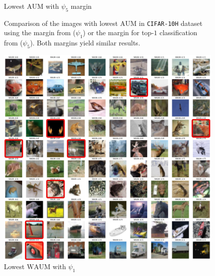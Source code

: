 \begin{figure}[thb]
\begin{minipage}{0.45\textwidth}
        \caption{Lowest $\mathrm{AUM}$ with $\psi_5$ margin}
        \label{fig:AUM_yang}
    \end{minipage}
    \caption{Comparison of the images with lowest $\mathrm{AUM}$ in \texttt{CIFAR-10H} dataset using the margin from \citet{pleiss_identifying_2020} ($\psi_1$) or the margin for top-$1$ classification from \citet{yang2020consistency} ($\psi_5$). Both margins yield similar results.}
    \label{fig:aum_app_cifar}
\end{figure}

\begin{figure}[thb]
    \centering
    \begin{minipage}{0.45\textwidth}
        \centering
        \includegraphics[width=\linewidth]{images/waum_pleiss.pdf}
        \caption{Lowest $\mathrm{WAUM}$ with $\psi_1$}
        \label{fig:WAUM_pleiss}
    \end{minipage}
    \hfill
    \begin{minipage}{0.45\textwidth}
        \centering

\end{minipage}
\end{figure}
